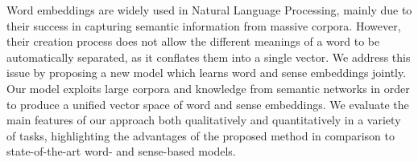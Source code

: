 Word embeddings are widely used in Natural Language Processing, mainly due to their success in capturing semantic information from massive corpora. However, their creation process does not allow the different meanings of a word to be automatically separated, as it conflates them into a single vector. We address this issue by proposing a new model which learns word and sense embeddings jointly. Our model exploits large corpora and knowledge from semantic networks in order to produce a unified vector space of word and sense embeddings. We evaluate the main features of our approach both qualitatively and quantitatively in a variety of tasks, highlighting the advantages of the proposed method in comparison to state-of-the-art word- and sense-based models.
